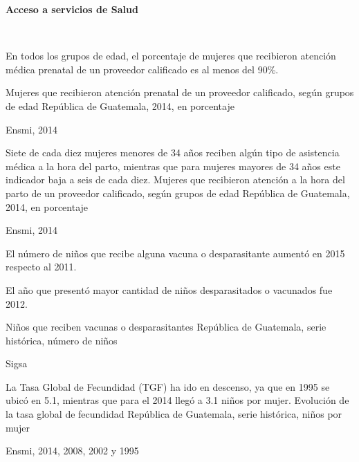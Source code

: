\begin{center}
\textbf{\color{color2}\LARGE \thesection} \quad  \textbf{\LARGE Acceso a servicios de Salud} 
\end{center}
$ \ $ \\[-5cm]
%
{%

En todos los grupos de edad, el porcentaje de mujeres que recibieron atención médica prenatal de un proveedor calificado es al menos del 90\%. 
}%
{%
	Mujeres que recibieron atención prenatal de un proveedor calificado, según grupos de edad} %
{%
	República de Guatemala, 2014, en porcentaje} %
{%
	\begin{tikzpicture}[x=1pt,y=1pt]    \end{tikzpicture}}%
{%
	Ensmi, 2014} %


%
{%
	Siete de cada diez mujeres menores de 34 años reciben algún tipo de asistencia médica a la hora del parto, mientras que para mujeres mayores de 34 años este indicador baja a seis de cada diez. 
}%
{%
	Mujeres que recibieron atención a la hora del parto  de un proveedor calificado, según grupos de edad} %
{%
	República de Guatemala, 2014, en porcentaje} %
{%
	\begin{tikzpicture}[x=1pt,y=1pt]    \end{tikzpicture}}%
{%
	Ensmi, 2014} %




%
{%
	El número de niños que recibe alguna vacuna o desparasitante aumentó en 2015 respecto al 2011. 
	
	El año que presentó mayor cantidad de niños desparasitados o vacunados fue  2012.
}%
{%
	Niños que reciben vacunas o desparasitantes} %
{%
	República de Guatemala, serie histórica, número de niños} %
{%
	\begin{tikzpicture}[x=1pt,y=1pt]    \end{tikzpicture}}%
{%
	Sigsa} %


%
{%
	La Tasa Global de Fecundidad (TGF) ha ido en descenso, ya que en 1995 se ubicó en 5.1, mientras que para el 2014 llegó a 3.1 niños por mujer. 
}%
{%
	Evolución de la tasa global de fecundidad} %
{%
	República de Guatemala, serie histórica, niños por mujer} %
{%
	\begin{tikzpicture}[x=1pt,y=1pt]    \end{tikzpicture}}%
{%
	Ensmi, 2014, 2008, 2002 y 1995} %

